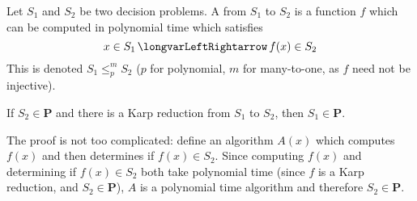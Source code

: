 \documentclass[10pt]{article}
\def\iff{\,\longvarLeftRightarrow\,}
\def\P{\mathbf{P}}
\begin{document}
\begin{defn*}

    Let $S_1$ and $S_2$ be two decision problems.
    A  from $S_1$ to $S_2$ is a function $f$ which can be computed in polynomial time which satisfies
    \[ x\in S_1 \iff f(x)\in S_2 \]
    This is denoted $S_1\leq_p^m S_2$ ($p$ for polynomial, $m$ for many-to-one, as $f$ need not be injective).

\end{defn*}

\begin{prop*}

    If $S_2\in\P$ and there is a Karp reduction from $S_1$ to $S_2$, then $S_1\in\P$.

\end{prop*}

The proof is not too complicated: define an algorithm $A(x)$ which computes $f(x)$ and then determines if $f(x)\in S_2$.
Since computing $f(x)$ and determining if $f(x)\in S_2$ both take polynomial time (since $f$ is a Karp reduction, and $S_2\in\P$), $A$ is a polynomial time algorithm and therefore $S_2\in\P$.
\end{document}
